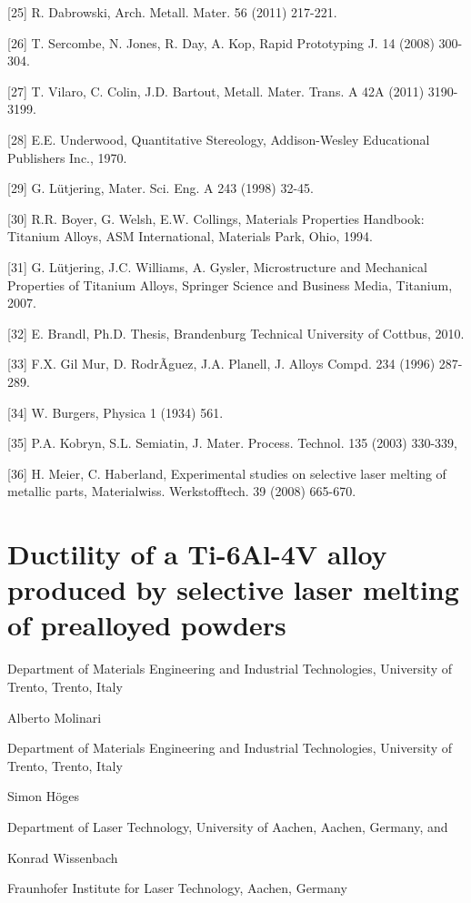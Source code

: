 \documentclass[10pt]{article}
\begin{document}
[25] R. Dabrowski, Arch. Metall. Mater. 56 (2011) 217-221.

[26] T. Sercombe, N. Jones, R. Day, A. Kop, Rapid Prototyping J. 14 (2008) 300-304.

[27] T. Vilaro, C. Colin, J.D. Bartout, Metall. Mater. Trans. A 42A (2011) 3190-3199.

[28] E.E. Underwood, Quantitative Stereology, Addison-Wesley Educational Publishers Inc., 1970.

[29] G. Lütjering, Mater. Sci. Eng. A 243 (1998) 32-45.

[30] R.R. Boyer, G. Welsh, E.W. Collings, Materials Properties Handbook: Titanium Alloys, ASM International, Materials Park, Ohio, 1994.

[31] G. Lütjering, J.C. Williams, A. Gysler, Microstructure and Mechanical Properties of Titanium Alloys, Springer Science and Business Media, Titanium, 2007.

[32] E. Brandl, Ph.D. Thesis, Brandenburg Technical University of Cottbus, 2010.

[33] F.X. Gil Mur, D. RodrÃguez, J.A. Planell, J. Alloys Compd. 234 (1996) 287-289.

[34] W. Burgers, Physica 1 (1934) 561.

[35] P.A. Kobryn, S.L. Semiatin, J. Mater. Process. Technol. 135 (2003) 330-339,

[36] H. Meier, C. Haberland, Experimental studies on selective laser melting of metallic parts, Materialwiss. Werkstofftech. 39 (2008) 665-670.

\section*{Ductility of a Ti-6Al-4V alloy produced by selective laser melting of prealloyed powders }
Department of Materials Engineering and Industrial Technologies, University of Trento, Trento, Italy

Alberto Molinari

Department of Materials Engineering and Industrial Technologies, University of Trento, Trento, Italy

Simon Höges

Department of Laser Technology, University of Aachen, Aachen, Germany, and

Konrad Wissenbach

Fraunhofer Institute for Laser Technology, Aachen, Germany
\end{document}
